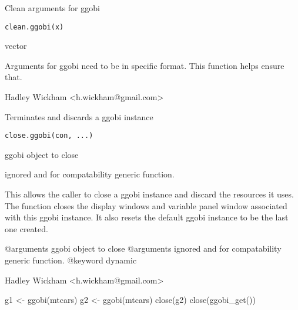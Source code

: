 \documentclass{article}
\begin{document}
\begin{Description}\relax
Clean arguments for ggobi
\end{Description}
\begin{Usage}
\begin{verbatim}clean.ggobi(x)\end{verbatim}
\end{Usage}
\begin{Arguments}
\begin{ldescription}
\item[\code{x}] vector
\end{ldescription}
\end{Arguments}
\begin{Details}\relax
Arguments for ggobi need to be in specific format.
This function helps ensure that.
\end{Details}
\begin{Author}\relax
Hadley Wickham <h.wickham@gmail.com>
\end{Author}
\begin{Examples}
\begin{ExampleCode}\end{ExampleCode}
\end{Examples}

\begin{Description}\relax
Terminates and discards a ggobi instance
\end{Description}
\begin{Usage}
\begin{verbatim}close.ggobi(con, ...)\end{verbatim}
\end{Usage}
\begin{Arguments}
\begin{ldescription}
\item[\code{con}] ggobi object to close
\item[\code{...}] ignored and for compatability generic function.
\end{ldescription}
\end{Arguments}
\begin{Details}\relax
This allows the caller to close a ggobi instance and discard the
resources it uses. The function closes the display windows and
variable panel window associated with this ggobi instance.
It also resets the default ggobi instance to be the last
one created.

@arguments ggobi object to close
@arguments ignored and for compatability generic function.
@keyword dynamic
\end{Details}
\begin{Author}\relax
Hadley Wickham <h.wickham@gmail.com>
\end{Author}
\begin{Examples}
\begin{ExampleCode}g1 <- ggobi(mtcars)
g2 <- ggobi(mtcars)
close(g2)
close(ggobi_get())\end{ExampleCode}
\end{Examples}
\end{document}
